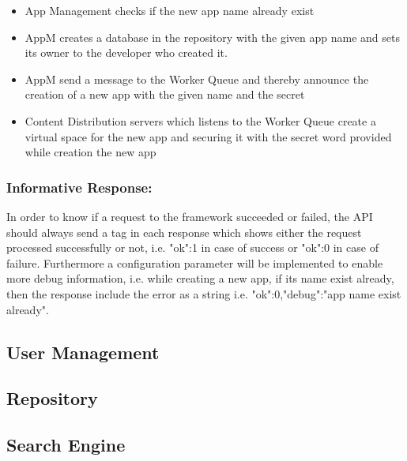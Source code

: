 \begin{itemize}
\begin{code}
\begin{verbatim}
GET https://user1:pass@107.23.121.185:8080/cccd/app
\end{verbatim}
Response:
\begin{verbatim}
{
"data":["app3","vod","vod1","app1"],
"ok":"1"
}
\end{verbatim}
\caption{Listing all collections within an app}
\label{lst:listing_coll}
\end{code}

\item App Management checks if the new app name already exist
\item AppM creates a database in the repository with the given app name and sets its owner to the developer who created it.
\item AppM send a message to the Worker Queue and thereby announce the creation of a new app with the given name and the secret
\item Content Distribution servers which listens to the Worker Queue create a virtual space for the new app and securing it with the secret word provided while creation the new app
\end{itemize}



\subsubsection{Informative Response:} In order to know if a request to the framework succeeded or failed, the API should always send a tag in each response which shows either the request processed successfully or not, i.e. {"ok":1} in case of success or {"ok":0} in case of failure. Furthermore a configuration parameter will be implemented to enable more debug information, i.e. while creating a new app, if its name exist already, then the response include the error as a string i.e. {"ok":0,"debug":"app name exist already"}.


\subsection{User Management}
\subsection{Repository\label{sec:des_repo}}
\subsection{Search Engine\label{sec:des_se_en}}
